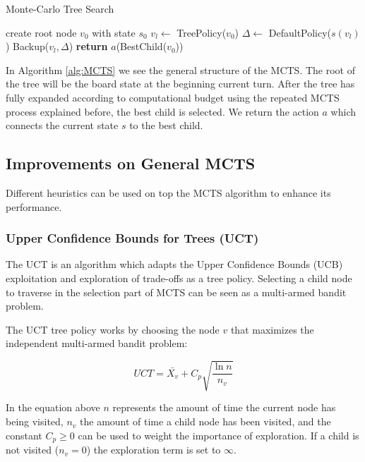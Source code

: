 \documentclass{ba-kecs}
\begin{document}
\begin{algorithm}
    \caption{Monte-Carlo Tree Search}
    \label{alg:MCTS}
    \begin{algorithmic}
            \State create root node $v_0$ with state $s_0$
                \State $v_l \gets$ TreePolicy($v_0$)
                \State $ \Delta \gets$ DefaultPolicy($s(v_l)$)
                \State Backup($v_l, \Delta$)
            \EndWhile\label{}
            \State \textbf{return} $a$(BestChild($v_0$))
        \EndProcedure
    \end{algorithmic}
\end{algorithm}
In Algorithm \ref{alg:MCTS} we see the general structure of the MCTS. The root of the tree will be the board state at the beginning current turn. After the tree has fully expanded according to computational budget using the repeated MCTS process explained before, the best child is selected. We return the action $a$ which connects the current state $s$ to the best child.
\subsection{Improvements on General MCTS}
Different heuristics can be used on top the MCTS algorithm to enhance its performance.
\subsubsection{Upper Confidence Bounds for Trees (UCT)}

The UCT is an algorithm which adapts the Upper Confidence Bounds (UCB) exploitation and exploration of trade-offs as a tree policy. 
Selecting a child node to traverse in the selection part of MCTS can be seen as a multi-armed bandit problem.\cite{auer2002using}

The UCT tree policy works by choosing the node $v$ that maximizes the independent multi-armed bandit problem:
\begin{center}
\begin{equation*}
	UCT = \bar{X_v} + C_p \sqrt{\frac{\ln n}{n_v}}
\end{equation*}
\end{center}
In the equation above $n$ represents the amount of time the current node has being visited, $n_v$ the amount of time a  child node has been visited, and the constant $C_p \geq0 $ can be used to weight the importance of exploration. If a child is not visited ($n_v = 0$) the exploration term is set to $\infty$.
\end{document}
